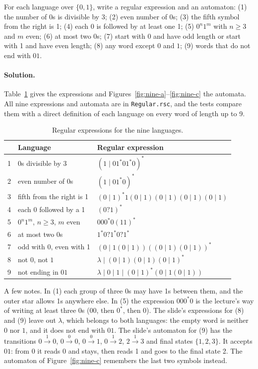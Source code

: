 \begin{exercise}
For each language over $\{0,1\}$, write a regular expression and an automaton:
(1) the number of 0s is divisible by 3; (2) even number of 0s; (3) the fifth
symbol from the right is 1; (4) each 0 is followed by at least one 1;
(5) $0^n 1^m$ with $n \ge 3$ and $m$ even; (6) at most two 0s; (7) start with 0
and have odd length or start with 1 and have even length; (8) any word except
$0$ and $1$; (9) words that do not end with $01$.
\end{exercise}

\paragraph{Solution.} Table~\ref{tab:nine} gives the expressions and
Figures~\ref{fig:nine-a}--\ref{fig:nine-c} the automata. All nine
expressions and automata are in \texttt{Regular.rsc}, and the tests compare
them with a direct definition of each language on every word of length up
to 9.

\begin{table}[h]
\centering
\small
\begin{tabular}{l l l}
  \toprule
  & Language & Regular expression \\
  \midrule
  1 & 0s divisible by 3         & $(1 \mid 01^*01^*0)^*$ \\
  2 & even number of 0s         & $(1 \mid 01^*0)^*$ \\
  3 & fifth from the right is 1 & $(0 \mid 1)^*1(0 \mid 1)(0 \mid 1)(0 \mid 1)(0 \mid 1)$ \\
  4 & each 0 followed by a 1    & $(0?1)^*$ \\
  5 & $0^n1^m$, $n \ge 3$, $m$ even & $000^*0(11)^*$ \\
  6 & at most two 0s            & $1^*0?1^*0?1^*$ \\
  7 & odd with 0, even with 1   & $(0 \mid 1(0 \mid 1))((0 \mid 1)(0 \mid 1))^*$ \\
  8 & not $0$, not $1$          & $\lambda \mid (0 \mid 1)(0 \mid 1)(0 \mid 1)^*$ \\
  9 & not ending in $01$        & $\lambda \mid 0 \mid 1 \mid (0 \mid 1)^*(0 \mid 1(0 \mid 1))$ \\
  \bottomrule
\end{tabular}
\caption{Regular expressions for the nine languages.}
\label{tab:nine}
\end{table}

A few notes. In (1) each group of three 0s may have 1s between them, and the
outer star allows 1s anywhere else. In (5) the expression $000^*0$ is the
lecture's way of writing at least three 0s ($00$, then $0^*$, then $0$). The
slide's expressions for (8) and (9) leave out $\lambda$, which belongs to both
languages: the empty word is neither $0$ nor $1$, and it does not end with
$01$. The slide's automaton for (9) has the transitions
$0 \xrightarrow{1} 0$, $0 \xrightarrow{0} 0$, $0 \xrightarrow{0} 1$,
$0 \xrightarrow{1} 2$, $2 \xrightarrow{1} 3$ and final states $\{1, 2, 3\}$. It
accepts $01$: from 0 it reads 0 and stays, then reads 1 and goes to the final
state 2. The automaton of Figure~\ref{fig:nine-c} remembers the last two
symbols instead.

